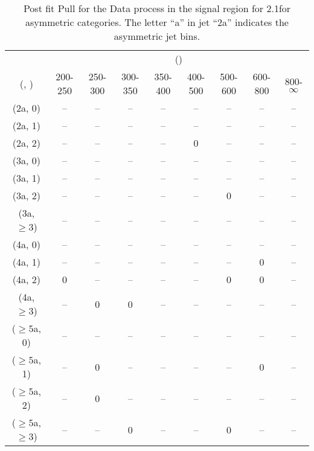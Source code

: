 \begin{table}[h!]
\tiny
\centering
\caption{Post fit Pull for the Data process in the signal region for 2.1\ifb for asymmetric categories. The letter ``a'' in jet \eg ``2a''  indicates the asymmetric jet bins.\label{tab:pullseppost_sig_data_asym}}
\begin{tabular}
{ccccccccc}
	\hline\hline
	& \multicolumn{8}{c}{\scalht (\gev)} \\ 
	 (\njet,  \nb) & 200-250 & 250-300 & 300-350 & 350-400 & 400-500 & 500-600 & 600-800 & 800-$\infty$ \\ [0.8ex] 
\hline
	(2a, 0) & -- & -- & -- & -- & -- & -- & -- & -- \\[0.5ex] 
	(2a, 1) & -- & -- & -- & -- & -- & -- & -- & -- \\[0.5ex] 
	(2a, 2) & -- & -- & -- & -- & 0 & -- & -- & -- \\[0.5ex] 
	(3a, 0) & -- & -- & -- & -- & -- & -- & -- & -- \\[0.5ex] 
	(3a, 1) & -- & -- & -- & -- & -- & -- & -- & -- \\[0.5ex] 
	(3a, 2) & -- & -- & -- & -- & -- & 0 & -- & -- \\[0.5ex] 
	(3a, $\ge3$) & -- & -- & -- & -- & -- & -- & -- & -- \\[0.5ex] 
	(4a, 0) & -- & -- & -- & -- & -- & -- & -- & -- \\[0.5ex] 
	(4a, 1) & -- & -- & -- & -- & -- & -- & 0 & -- \\[0.5ex] 
	(4a, 2) & 0 & -- & -- & -- & -- & 0 & 0 & -- \\[0.5ex] 
	(4a, $\ge3$) & -- & 0 & 0 & -- & -- & -- & -- & -- \\[0.5ex] 
	($\ge5$a, 0) & -- & -- & -- & -- & -- & -- & -- & -- \\[0.5ex] 
	($\ge5$a, 1) & -- & 0 & -- & -- & -- & -- & 0 & -- \\[0.5ex] 
	($\ge5$a, 2) & -- & 0 & -- & -- & -- & -- & -- & -- \\[0.5ex] 
	($\ge5$a, $\ge3$) & -- & -- & 0 & -- & -- & 0 & -- & -- \\[0.5ex] 
	\hline
	\hline
\end{tabular}
\end{table}
